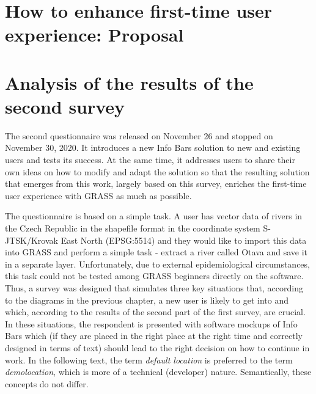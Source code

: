 \documentclass[a4paper,10pt,twoside]{article}
\begin{document}
\newpage
\vspace*{-1cm}
\section{How to enhance first-time user experience: Proposal}
\label{sec:proposal1}


\newpage
\vspace*{-1cm}
\section{Analysis of the results of the second survey}
\label{sec:qstat2}

\noindent The second questionnaire was released on November 26 and stopped on November 30, 2020. It introduces a new Info Bars solution to new and existing users and tests its success. At the same time, it addresses users to share their own ideas on how to modify and adapt the solution so that the resulting solution that emerges from this work, largely based on this survey, enriches the first-time user experience with GRASS as much as possible.

The questionnaire is based on a simple task. A user has vector data of rivers in the Czech Republic in the shapefile format in the coordinate system S-JTSK/Krovak East North (EPSG:5514) and they would like to import this data into GRASS and perform a simple task - extract a river called Otava and save it in a separate layer. Unfortunately, due to external epidemiological circumstances, this task could not be tested among GRASS beginners directly on the software. Thus, a survey was designed that simulates three key situations that, according to the diagrams in the previous chapter, a new user is likely to get into and which, according to the results of the second part of the first survey, are crucial. In these situations, the respondent is presented with software mockups of Info Bars which (if they are placed in the right place at the right time and correctly designed in terms of text) should lead to the right decision on how to continue in work. In the following text, the term \textit{default location} is preferred to the term \textit{demolocation}, which is more of a technical (developer) nature. Semantically, these concepts do not differ.
\end{document}
